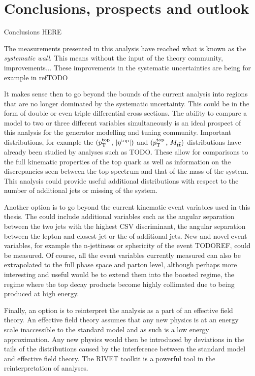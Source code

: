 \chapter{Conclusions, prospects and outlook}
\label{ch:outlook}

Conclusions HERE

The measurements presented in this analysis have reached what is known as the \textit{systematic wall}.
This means without the input of the theory community, improvements...
These improvements in the systematic uncertainties are being for example in refTODO

It makes sense then to go beyond the bounds of the current analysis into regions that are no longer dominated by the systematic uncertainty.
This could be in the form of double or even triple differential cross sections.
The ability to compare a model to two or three different variables simultaneously is an ideal prospect of this analysis for the \ttbar{} generator modelling and tuning community.
Important distributions, for example the $(p_{\mathrm{T}}^{\mathrm{top}}\,,\,\lvert \eta^{\mathrm{top}} \rvert)$ and $(p_{\mathrm{T}}^{\mathrm{top}}\,,\,M_{\mathrm{t}\overline{\mathrm{t}}})$ distributions have already been studied by analyses such as TODO.
These allow for comparisons to the full kinematic properties of the top quark as well as information on the discrepancies seen between the top \pt{} spectrum and that of the mass of the \ttbar{} system.
This analysis could provide useful additional distributions with respect to the number of additional jets or missing \pt{} of the system.

Another option is to go beyond the current kinematic event variables used in this thesis.
The could include additional variables such as the angular separation between the two \bquark{} jets with the highest CSV discriminant, the angular separation between the lepton and closest \bquark{} jet or the \pt{} of additional jets.
New and novel event variables, for example the n-jettiness or sphericity of the event TODOREF, could be measured. 
Of course, all the event variables currently measured can also be extrapolated to the full phase space and parton level, although perhaps more interesting and useful would be to extend them into the boosted regime, \ie{} the regime where the top decay products become highly collimated due to being produced at high energy.

Finally, an option is to reinterpret the analysis as a part of an effective field theory.
An effective field theory assumes that any new physics is at an energy scale inaccessible to the standard model and as such is a low energy approximation.
Any new physics would then be introduced by deviations in the tails of the distributions caused by the interference between the standard model and effective field theory.
The RIVET toolkit is a powerful tool in the reinterpretation of analyses.

